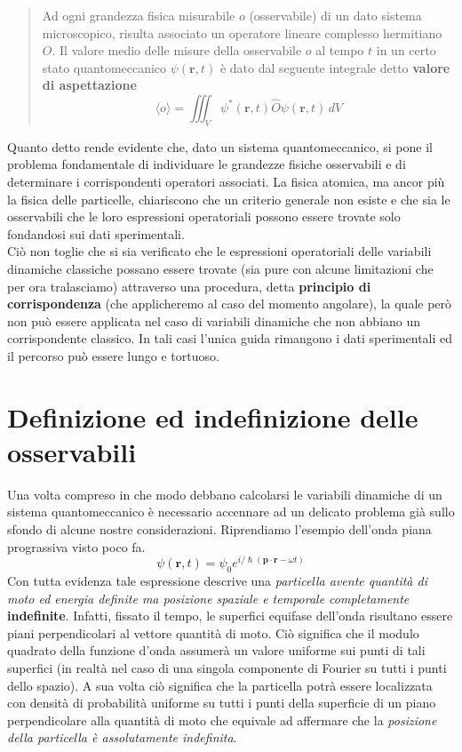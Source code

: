 \begin{quote}
    Ad ogni grandezza fisica misurabile \(o\) (osservabile) di un dato
    sistema microscopico, risulta associato un operatore lineare complesso
    hermitiano \(O\).
    Il valore medio delle misure della osservabile \(o\)
    al tempo \(t\) in un certo stato quantomeccanico \(\psi(\bm{r},t)\) è
    dato dal seguente integrale detto \textbf{valore di aspettazione}
    \begin{equation}
        \boxed{\langle o \rangle = \iiint_{V} \psi^{*}(\bm{r},t)\hat{O}\psi(\bm{r},t) \, dV}
        \label{eq:observable-qm-axiom}
    \end{equation}
\end{quote}

Quanto detto rende evidente che, dato un sistema quantomeccanico, si
pone il problema fondamentale di individuare le grandezze fisiche
osservabili e di determinare i corrispondenti operatori associati.
La
fisica atomica, ma ancor più la fisica delle particelle, chiariscono che
un criterio generale non esiste e che sia le osservabili che le loro
espressioni operatoriali possono essere trovate solo fondandosi sui dati
sperimentali.\\
Ciò non toglie che si sia verificato che le espressioni operatoriali
delle variabili dinamiche classiche possano essere trovate (sia pure con
alcune limitazioni che per ora tralasciamo) attraverso una procedura,
detta \textbf{principio di corrispondenza} (che applicheremo al caso del
momento angolare), la quale però non può essere applicata nel caso di
variabili dinamiche che non abbiano un corrispondente classico.
In tali
casi l'unica guida rimangono i dati sperimentali ed il percorso può
essere lungo e tortuoso.

\section{Definizione ed indefinizione delle osservabili}
\label{sec:definizione-ed-indefinizione-delle-osservabili}

Una volta compreso in che modo debbano calcolarsi le variabili dinamiche
di un sistema quantomeccanico è necessario accennare ad un delicato
problema già sullo sfondo di alcune nostre considerazioni.
Riprendiamo
l'esempio dell'onda piana prograssiva visto poco fa. \[
                                                         \psi(\bm{r},t) = \psi_{0}e^{ i/\hslash (\bm{p}\cdot \bm{r}- \omega t)}
\] Con tutta evidenza tale espressione descrive una \emph{particella avente
quantità di moto ed energia definite ma posizione spaziale e temporale
completamente} \textbf{indefinite}.
Infatti, fissato il tempo, le
superfici equifase dell'onda risultano essere piani perpendicolari al
vettore quantità di moto.
Ciò significa che il modulo quadrato della
funzione d'onda assumerà un valore uniforme sui punti di tali superfici
(in realtà nel caso di una singola componente di Fourier su tutti i
punti dello spazio).
A sua volta ciò significa che la particella potrà
essere localizzata con densità di probabilità uniforme su tutti i punti
della superficie di un piano perpendicolare alla quantità di moto che
equivale ad affermare che la \emph{posizione della particella è assolutamente
indefinita}.

